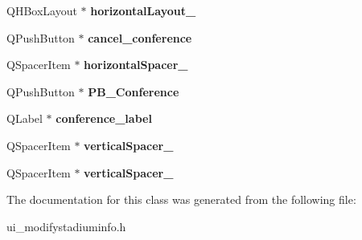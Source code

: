 \begin{DoxyCompactItemize}
Q\+H\+Box\+Layout $\ast$ {\bfseries horizontal\+Layout\+\_}
\item 
\mbox{\label{class_ui__modify_stadium_info_a98dd83cf73cb27d2eefc51c5219fba70}} 
Q\+Push\+Button $\ast$ {\bfseries cancel\+\_\+conference}
\item 
\mbox{\label{class_ui__modify_stadium_info_a5b5020c30a62838402ce07b07e73692b}} 
Q\+Spacer\+Item $\ast$ {\bfseries horizontal\+Spacer\+\_}
\item 
\mbox{\label{class_ui__modify_stadium_info_a1bc42e5244bea86b3e51aadaaf998724}} 
Q\+Push\+Button $\ast$ {\bfseries P\+B\+\_\+\+Conference}
\item 
\mbox{\label{class_ui__modify_stadium_info_a49f3f4a1c6f222cf336974a5143552ba}} 
Q\+Label $\ast$ {\bfseries conference\+\_\+label}
\item 
\mbox{\label{class_ui__modify_stadium_info_a6c2eff8ebcc565138255e0836fec87e8}} 
Q\+Spacer\+Item $\ast$ {\bfseries vertical\+Spacer\+\_}
\item 
\mbox{\label{class_ui__modify_stadium_info_a186080de3650503d33ad86a73389835b}} 
Q\+Spacer\+Item $\ast$ {\bfseries vertical\+Spacer\+\_}
\end{DoxyCompactItemize}


The documentation for this class was generated from the following file\+:\begin{DoxyCompactItemize}
\item 
ui\+\_\+modifystadiuminfo.\+h\end{DoxyCompactItemize}
